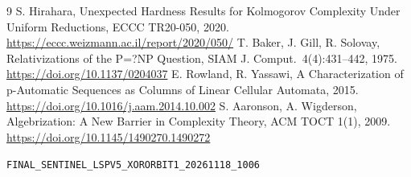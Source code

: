 \documentclass[11pt]{article}
\begin{document}
\begin{thebibliography}{9}
 S. Hirahara, Unexpected Hardness Results for Kolmogorov
Complexity Under Uniform Reductions, ECCC TR20-050, 2020.
\url{https://eccc.weizmann.ac.il/report/2020/050/}
 T. Baker, J. Gill, R. Solovay, Relativizations of the
P=?NP Question, SIAM J. Comput.\ 4(4):431--442, 1975.
\url{https://doi.org/10.1137/0204037}
 E. Rowland, R. Yassawi, A Characterization of
p-Automatic Sequences as Columns of Linear Cellular Automata, 2015.
\url{https://doi.org/10.1016/j.aam.2014.10.002}
 S. Aaronson, A. Wigderson, Algebrization: A New
Barrier in Complexity Theory, ACM TOCT 1(1), 2009.
\url{https://doi.org/10.1145/1490270.1490272}
\end{thebibliography}
\noindent\texttt{FINAL\_SENTINEL\_LSPV5\_XORORBIT1\_20261118\_1006}
\end{document}
